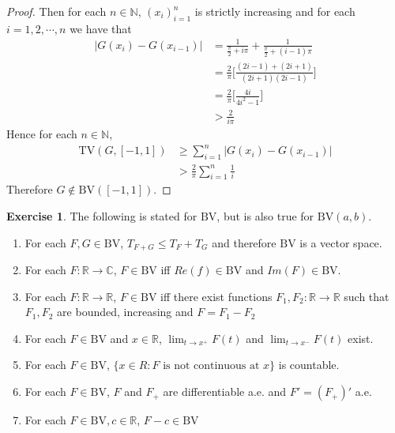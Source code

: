 \documentclass[12pt]{amsart}
\theoremstyle{definition}
\newtheorem{ex}[definition]{Exercise}
\newcommand{\C}{\mathbb{C}}
\newcommand{\N}{\mathbb{N}}
\newcommand{\R}{\mathbb{R}}
\newcommand{\BV}{\text{BV}}
\newcommand{\TV}{\text{TV}}
\newcommand{\lex}[1]{\label{ex:#1}}
\begin{document}
\begin{proof}
		Then for each $n \in \N$, $(x_i)_{i=1}^n$ is strictly increasing and for each $i=1,2,\cdots, n$ we have that 
		\begin{align*}
			|G(x_i)-G(x_{i-1})|
			&=\frac{1}{\frac{\pi}{2}+i\pi}+ \frac{1}{\frac{\pi}{2}+(i-1)\pi}\\
			&=\frac{2}{\pi}\bigg[\frac{(2i-1)+(2i+1)}{(2i+1)(2i-1)}\bigg]\\
			&=\frac{2}{\pi}\bigg[\frac{4i}{4i^2-1}\bigg]\\
			& > \frac{2}{i\pi}
		\end{align*}
		\newpage
		Hence for each $n \in \N$,
		\begin{align*}
			\TV(G,[-1,1]) 
			&\geq \sum_{i=1}^n|G(x_i)-G(x_{i-1})| \\
			& > \frac{2}{\pi}\sum_{i=1}^n \frac{1}{i}
		\end{align*}
		Therefore $G \not \in \BV([-1,1])$.
	\end{proof}
	
	\begin{ex} \lex{00000}  The following is stated for $\BV$, but is also true for $\BV(a,b)$.
		
		\begin{enumerate} 
			\item For each $F,G \in \BV$, $T_{F+G} \leq T_F + T_G$ and therefore $\BV$ is a vector space. 
			\item For each $F: \R \rightarrow \C$, $F \in \BV$ iff $Re(f) \in \BV$ and $Im(F) \in \BV$.
			\item For each $F:\R \rightarrow \R$, $F \in \BV$ iff there exist functions $F_1,F_2:\R \rightarrow \R$ such that $F_1,F_2$ are bounded, increasing and $F=F_1-F_2$
			\item For each $F \in \BV$ and $x \in \R$, $\lim_{t \rightarrow x^+}F(t)$ and $\lim_{t \rightarrow x^-}F(t)$ exist. 
			\item For each $F \in \BV$, $\{x \in R: F \text{ is not continuous at }x\}$ is countable.
			\item For each $F \in \BV$, $F$ and $F_+$ are differentiable a.e. and $F'=(F_+)'$ a.e.
			\item For each $F \in \BV, c \in \R$, $F-c \in \BV$
		\end{enumerate}
	\end{ex}
	
\end{document}
